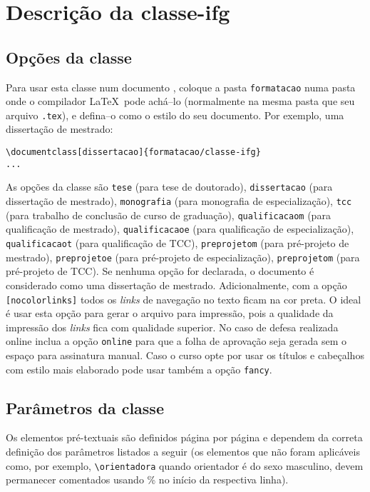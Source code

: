 \chapter{Descrição da \textsf{classe-ifg}}
\label{cap:descr}

\section{Opções da classe}
\label{sec:opcoes}
Para usar esta classe num documento \LaTeXe, coloque a pasta \verb|formatacao| numa pasta onde o compilador \LaTeX\ pode achá--lo (normalmente na mesma pasta que seu arquivo \verb|.tex|), e defina--o como o estilo do seu documento. Por exemplo, uma dissertação de mestrado:
\begin{verbatim}
\documentclass[dissertacao]{formatacao/classe-ifg}
...

\end{verbatim}

As opções da classe são \verb|tese| (para tese de doutorado), \verb|dissertacao| (para dissertação de mestrado), \verb|monografia| (para monografia de especialização), \verb|tcc| (para trabalho de conclusão de curso de graduação), \verb|qualificacaom| (para qualificação de mestrado), \verb|qualificacaoe| (para qualificação de especialização), \verb|qualificacaot| (para qualificação de TCC), \verb|preprojetom| (para pré-projeto de mestrado), \verb|preprojetoe| (para pré-projeto de especialização), \verb|preprojetom| (para pré-projeto de TCC). Se nenhuma opção for declarada, o documento é considerado como uma dissertação de mestrado. Adicionalmente, com a opção \verb|[nocolorlinks]| todos os {\em links} de navegação no texto ficam na cor preta. O ideal é usar esta opção para gerar o arquivo para impressão, pois a qualidade da impressão dos {\em links} fica com qualidade superior. No caso de defesa realizada online inclua a opção \verb|online| para que a folha de aprovação seja gerada sem o espaço para assinatura manual. Caso o curso opte por usar os títulos e cabeçalhos com estilo mais elaborado pode usar também a opção \verb|fancy|.


\section{Parâmetros da classe}
\label{sec:param}
Os elementos pré-textuais são definidos página por página e dependem da correta definição dos parâmetros listados a seguir (os elementos que não foram aplicáveis como, por exemplo, \verb|\orientadora| quando orientador é do sexo masculino, devem permanecer comentados usando \% no início da respectiva linha).


